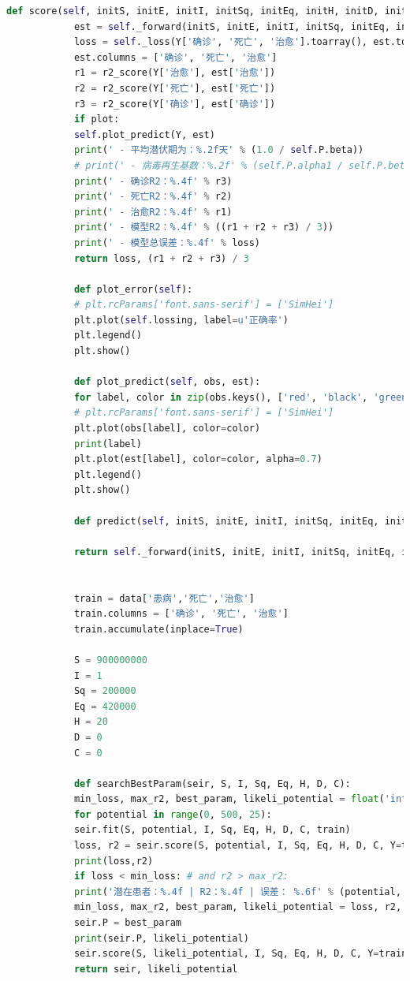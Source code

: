 \documentclass{whutmod}
\begin{document}
\begin{lstlisting}[language=python]
			def score(self, initS, initE, initI, initSq, initEq, initH, initD, initC, Y, plot=False):
			est = self._forward(initS, initE, initI, initSq, initEq, initH, initD, initC, self.P, len(Y))['I', 'D', 'C']
			loss = self._loss(Y['确诊', '死亡', '治愈'].toarray(), est.toarray())
			est.columns = ['确诊', '死亡', '治愈']
			r1 = r2_score(Y['治愈'], est['治愈'])
			r2 = r2_score(Y['死亡'], est['死亡'])
			r3 = r2_score(Y['确诊'], est['确诊'])
			if plot:
			self.plot_predict(Y, est)
			print(' - 平均潜伏期为：%.2f天' % (1.0 / self.P.beta))
			# print(' - 病毒再生基数：%.2f' % (self.P.alpha1 / self.P.beta + (self.P.alpha2 / self.P.sigma + self.P.alpha2 / self.P.gamma)/ 2))
			print(' - 确诊R2：%.4f' % r3)
			print(' - 死亡R2：%.4f' % r2)
			print(' - 治愈R2：%.4f' % r1)
			print(' - 模型R2：%.4f' % ((r1 + r2 + r3) / 3))
			print(' - 模型总误差：%.4f' % loss)
			return loss, (r1 + r2 + r3) / 3
			
			def plot_error(self):
			# plt.rcParams['font.sans-serif'] = ['SimHei']
			plt.plot(self.lossing, label=u'正确率')
			plt.legend()
			plt.show()
			
			def plot_predict(self, obs, est):
			for label, color in zip(obs.keys(), ['red', 'black', 'green']):
			# plt.rcParams['font.sans-serif'] = ['SimHei']
			plt.plot(obs[label], color=color)
			print(label)
			plt.plot(est[label], color=color, alpha=0.7)
			plt.legend()
			plt.show()
			
			def predict(self, initS, initE, initI, initSq, initEq, initH, initD, initC, T):
			
			return self._forward(initS, initE, initI, initSq, initEq, initH, initD, initC, self.P, T)
			
			
			train = data['患病','死亡','治愈']
			train.columns = ['确诊', '死亡', '治愈']
			train.accumulate(inplace=True)
			
			S = 900000000
			I = 1
			Sq = 200000
			Eq = 420000
			H = 20
			D = 0
			C = 0
			
			def searchBestParam(seir, S, I, Sq, Eq, H, D, C):
			min_loss, max_r2, best_param, likeli_potential = float('inf'),0.0, None, 0
			for potential in range(0, 500, 25):
			seir.fit(S, potential, I, Sq, Eq, H, D, C, train)
			loss, r2 = seir.score(S, potential, I, Sq, Eq, H, D, C, Y=train)
			print(loss,r2)
			if loss < min_loss: # and r2 > max_r2:
			print('潜在患者：%.4f | R2：%.4f | 误差： %.6f' % (potential, r2, loss))
			min_loss, max_r2, best_param, likeli_potential = loss, r2, seir.P, potential
			seir.P = best_param
			print(seir.P, likeli_potential)
			seir.score(S, likeli_potential, I, Sq, Eq, H, D, C, Y=train, plot=True)
			return seir, likeli_potential
			

\end{lstlisting}
\end{document}
